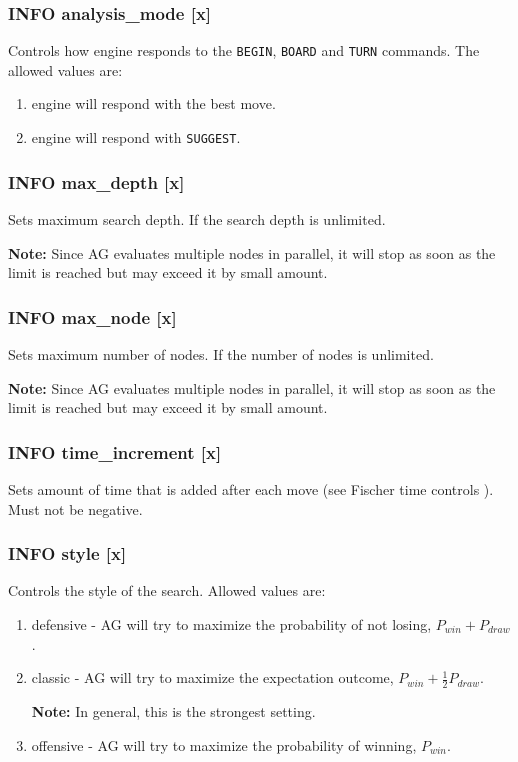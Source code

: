 \documentclass[12pt,a4paper]{article}
\begin{document}
\subsubsection{INFO analysis{\_}mode [x]}
Controls how engine responds to the \texttt{BEGIN}, \texttt{BOARD} and \texttt{TURN} commands. The allowed values are:
\begin{enumerate}[leftmargin=7.5em]
	\item[\text{$[x]=0$}]{engine will respond with the best move.}
	\item[\text{$[x]=1$}]{engine will respond with \texttt{SUGGEST}.}
\end{enumerate}

\subsubsection{INFO max{\_}depth [x]}
Sets maximum search depth. If  the search depth is unlimited.

\textbf{Note:} Since AG evaluates multiple nodes in parallel, it will stop as soon as the limit is reached but may exceed it by small amount.

\subsubsection{INFO max{\_}node [x]}
Sets maximum number of nodes. If  the number of nodes is unlimited.

\textbf{Note:} Since AG evaluates multiple nodes in parallel, it will stop as soon as the limit is reached but may exceed it by small amount.

\subsubsection{INFO time{\_}increment [x]}
Sets amount of time that is added after each move (see Fischer time controls \cite{fischer}). Must not be negative.

\subsubsection{INFO style [x]}
Controls the style of the search. Allowed values are:
\begin{enumerate}[leftmargin=7.5em]
	\item[\text{$[x]=0$}]{defensive - AG will try to maximize the probability of not losing, $P_{win} + P_{draw}$.}
	\item[\text{$[x]=1$}]{classic - AG will try to maximize the expectation outcome, $P_{win} + \frac{1}{2}P_{draw}$.
	
	\textbf{Note:} In general, this is the strongest setting.}
	\item[\text{$[x]=2$}]{offensive - AG will try to maximize the probability of winning, $P_{win}$.}
\end{enumerate}
\end{document}
